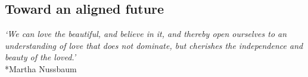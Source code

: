 \documentclass[12pt]{article}
\begin{document}








\subsection{Toward an aligned future}
\label{sec:toward}


\begin{center}
\textit{`We can love the beautiful, and believe in it, and thereby open ourselves to an understanding of love that does not dominate, but cherishes the independence and beauty of the loved.'}\\*Martha Nussbaum
\end{center}
\end{document}
